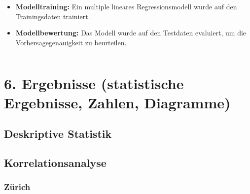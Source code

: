 \documentclass[
  journal,
]{IEEEtran}%
\begin{document}
\begin{itemize}
\item
  \textbf{Modelltraining:} Ein multiple lineares Regressionsmodell wurde
  auf den Trainingsdaten trainiert.
\item
  \textbf{Modellbewertung:} Das Modell wurde auf den Testdaten
  evaluiert, um die Vorhersagegenauigkeit zu beurteilen.
\end{itemize}

\begin{verbatim}
\end{verbatim}

\section{6. Ergebnisse (statistische Ergebnisse, Zahlen,
Diagramme)}\label{ergebnisse-statistische-ergebnisse-zahlen-diagramme}

\subsection{\texorpdfstring{\textbf{Deskriptive
Statistik}}{Deskriptive Statistik}}\label{deskriptive-statistik-1}

\subsection{\texorpdfstring{\textbf{Korrelationsanalyse}}{Korrelationsanalyse}}\label{korrelationsanalyse-1}

\subsubsection{Zürich}\label{zuxfcrich}
\end{document}
